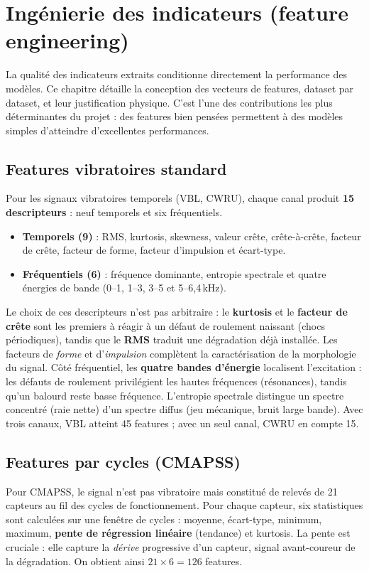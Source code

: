 \chapter{Ingénierie des indicateurs (feature engineering)}
\label{chap:features}

La qualité des indicateurs extraits conditionne directement la performance des modèles. Ce
chapitre détaille la conception des vecteurs de features, dataset par dataset, et leur
justification physique. C'est l'une des contributions les plus déterminantes du projet :
des features bien pensées permettent à des modèles simples d'atteindre d'excellentes
performances.

\section{Features vibratoires standard}
Pour les signaux vibratoires temporels (VBL, CWRU), chaque canal produit \textbf{15
descripteurs} : neuf temporels et six fréquentiels.

\begin{itemize}[leftmargin=1.5em]
  \item \textbf{Temporels (9)} : RMS, kurtosis, skewness, valeur crête, crête-à-crête,
        facteur de crête, facteur de forme, facteur d'impulsion et écart-type.
  \item \textbf{Fréquentiels (6)} : fréquence dominante, entropie spectrale et quatre
        énergies de bande (0--1, 1--3, 3--5 et 5--6{,}4\,kHz).
\end{itemize}

Le choix de ces descripteurs n'est pas arbitraire : le \textbf{kurtosis} et le \textbf{facteur
de crête} sont les premiers à réagir à un défaut de roulement naissant (chocs périodiques),
tandis que le \textbf{RMS} traduit une dégradation déjà installée. Les facteurs de
\emph{forme} et d'\emph{impulsion} complètent la caractérisation de la morphologie du signal.
Côté fréquentiel, les \textbf{quatre bandes d'énergie} localisent l'excitation : les défauts
de roulement privilégient les hautes fréquences (résonances), tandis qu'un balourd reste basse
fréquence. L'entropie spectrale distingue un spectre concentré (raie nette) d'un spectre
diffus (jeu mécanique, bruit large bande). Avec trois canaux, VBL atteint 45 features ; avec
un seul canal, CWRU en compte 15.

\section{Features par cycles (CMAPSS)}
Pour CMAPSS, le signal n'est pas vibratoire mais constitué de relevés de 21 capteurs au fil
des cycles de fonctionnement. Pour chaque capteur, six statistiques sont calculées sur une
fenêtre de cycles : moyenne, écart-type, minimum, maximum, \textbf{pente de régression
linéaire} (tendance) et kurtosis. La pente est cruciale : elle capture la \emph{dérive}
progressive d'un capteur, signal avant-coureur de la dégradation. On obtient ainsi
$21 \times 6 = 126$ features.

